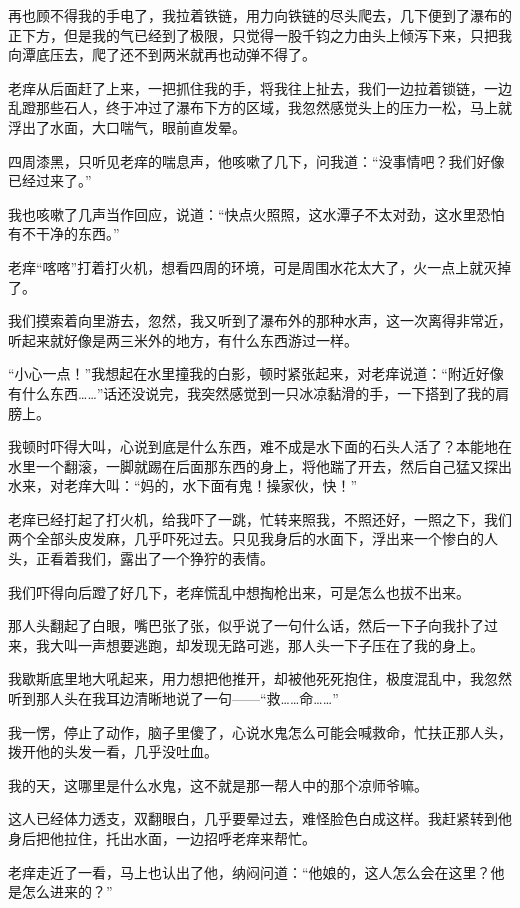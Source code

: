 再也顾不得我的手电了，我拉着铁链，用力向铁链的尽头爬去，几下便到了瀑布的正下方，但是我的气已经到了极限，只觉得一股千钧之力由头上倾泻下来，只把我向潭底压去，爬了还不到两米就再也动弹不得了。

老痒从后面赶了上来，一把抓住我的手，将我往上扯去，我们一边拉着锁链，一边乱蹬那些石人，终于冲过了瀑布下方的区域，我忽然感觉头上的压力一松，马上就浮出了水面，大口喘气，眼前直发晕。

四周漆黑，只听见老痒的喘息声，他咳嗽了几下，问我道：“没事情吧？我们好像已经过来了。”

我也咳嗽了几声当作回应，说道：“快点火照照，这水潭子不太对劲，这水里恐怕有不干净的东西。”

老痒“喀喀”打着打火机，想看四周的环境，可是周围水花太大了，火一点上就灭掉了。

我们摸索着向里游去，忽然，我又听到了瀑布外的那种水声，这一次离得非常近，听起来就好像是两三米外的地方，有什么东西游过一样。

“小心一点！”我想起在水里撞我的白影，顿时紧张起来，对老痒说道：“附近好像有什么东西……”话还没说完，我突然感觉到一只冰凉黏滑的手，一下搭到了我的肩膀上。

我顿时吓得大叫，心说到底是什么东西，难不成是水下面的石头人活了？本能地在水里一个翻滚，一脚就踢在后面那东西的身上，将他踹了开去，然后自己猛又探出水来，对老痒大叫：“妈的，水下面有鬼！操家伙，快！”

老痒已经打起了打火机，给我吓了一跳，忙转来照我，不照还好，一照之下，我们两个全部头皮发麻，几乎吓死过去。只见我身后的水面下，浮出来一个惨白的人头，正看着我们，露出了一个狰狞的表情。

我们吓得向后蹬了好几下，老痒慌乱中想掏枪出来，可是怎么也拔不出来。

那人头翻起了白眼，嘴巴张了张，似乎说了一句什么话，然后一下子向我扑了过来，我大叫一声想要逃跑，却发现无路可逃，那人头一下子压在了我的身上。

我歇斯底里地大吼起来，用力想把他推开，却被他死死抱住，极度混乱中，我忽然听到那人头在我耳边清晰地说了一句——“救……命……”

我一愣，停止了动作，脑子里傻了，心说水鬼怎么可能会喊救命，忙扶正那人头，拨开他的头发一看，几乎没吐血。

我的天，这哪里是什么水鬼，这不就是那一帮人中的那个凉师爷嘛。

这人已经体力透支，双翻眼白，几乎要晕过去，难怪脸色白成这样。我赶紧转到他身后把他拉住，托出水面，一边招呼老痒来帮忙。

老痒走近了一看，马上也认出了他，纳闷问道：“他娘的，这人怎么会在这里？他是怎么进来的？”

